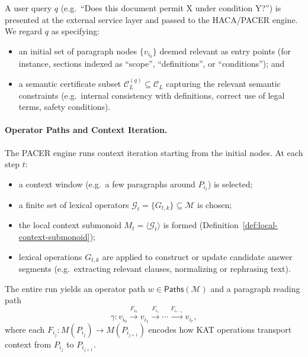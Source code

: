 \documentclass[11pt]{book}
\theoremstyle{plain}
\theoremstyle{definition}
\theoremstyle{remark}
\begin{document}
A user query $q$ (e.g.\ ``Does this document permit X under
condition Y?'') is presented at the external service layer and passed
to the HACA/PACER engine. We regard $q$ as specifying:
\begin{itemize}
  \item an initial set of paragraph nodes $\{v_{i_0}\}$ deemed
        relevant as entry points (for instance, sections indexed as
        ``scope'', ``definitions'', or ``conditions''); and
  \item a semantic certificate subset
        $\mathcal{C}_L^{(q)}\subseteq\mathcal{C}_L$ capturing the
        relevant semantic constraints (e.g.\ internal consistency with
        definitions, correct use of legal terms, safety conditions).
\end{itemize}

\paragraph{Operator Paths and Context Iteration.}
The PACER engine runs context iteration starting from the initial
nodes. At each step $t$:
\begin{itemize}
  \item a context window (e.g.\ a few paragraphs around $P_{i_t}$) is
        selected;
  \item a finite set of lexical operators
        $\mathcal{G}_t=\{G_{t,k}\}\subseteq\mathcal{M}$ is chosen;
  \item the local context submonoid $M_t=\langle\mathcal{G}_t\rangle$
        is formed (Definition~\ref{def:local-context-submonoid});
  \item lexical operations $G_{t,k}$ are applied to construct or
        update candidate answer segments (e.g.\ extracting relevant
        clauses, normalizing or rephrasing text).
\end{itemize}
The entire run yields an operator path $w\in\mathsf{Paths}(\mathcal{M})$
and a paragraph reading path
\[
  \gamma:
  v_{i_0}\xrightarrow{F_{i_0}}v_{i_1}\xrightarrow{F_{i_1}}\cdots
  \xrightarrow{F_{i_{r-1}}}v_{i_r},
\]
where each $F_{i_j}:M(P_{i_j})\to M(P_{i_{j+1}})$ encodes how KAT
operations transport context from $P_{i_j}$ to $P_{i_{j+1}}$.
\end{document}
